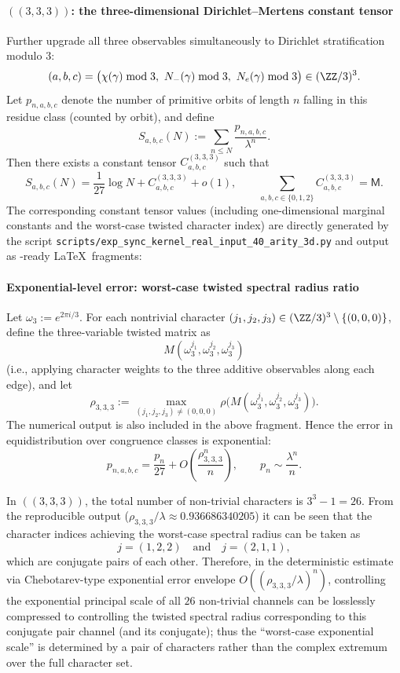 \paragraph{\texorpdfstring{$((3,3,3))$}{(3,3,3)}: the three-dimensional Dirichlet--Mertens constant tensor}
Further upgrade all three observables simultaneously to Dirichlet stratification modulo $3$:
$$
(a,b,c)=\bigl(\chi(\gamma)\bmod 3,\ N_-(\gamma)\bmod 3,\ N_e(\gamma)\bmod 3\bigr)\in(\ZZ/3)^3.
$$
Let $p_{n,a,b,c}$ denote the number of primitive orbits of length $n$ falling in this residue class (counted by orbit), and define
$$
S_{a,b,c}(N):=\sum_{n\le N}\frac{p_{n,a,b,c}}{\lambda^n}.
$$
Then there exists a constant tensor $C^{(3,3,3)}_{a,b,c}$ such that
$$
S_{a,b,c}(N)=\frac{1}{27}\log N + C^{(3,3,3)}_{a,b,c}+o(1),
\qquad
\sum_{a,b,c\in\{0,1,2\}} C^{(3,3,3)}_{a,b,c}=\mathsf{M}.
$$
The corresponding constant tensor values (including one-dimensional marginal constants and the worst-case twisted character index) are directly generated by the script
\texttt{scripts/exp\_sync\_kernel\_real\_input\_40\_arity\_3d.py}
and output as \verb||-ready \LaTeX\ fragments:


\paragraph{Exponential-level error: worst-case twisted spectral radius ratio}
Let $\omega_3:=e^{2\pi i/3}$. For each nontrivial character $(j_1,j_2,j_3)\in(\ZZ/3)^3\setminus\{(0,0,0)\}$, define the three-variable twisted matrix as
$$
M(\omega_3^{j_1},\omega_3^{j_2},\omega_3^{j_3})
$$
(i.e., applying character weights to the three additive observables along each edge), and let
$$
\rho_{3,3,3}
:=
\max_{(j_1,j_2,j_3)\neq(0,0,0)}
\rho\bigl(M(\omega_3^{j_1},\omega_3^{j_2},\omega_3^{j_3})\bigr).
$$
The numerical output is also included in the above \verb|| fragment.
Hence the error in equidistribution over congruence classes is exponential:
$$
p_{n,a,b,c}=\frac{p_n}{27}+O\!\left(\frac{\rho_{3,3,3}^n}{n}\right),
\qquad
p_n\sim\frac{\lambda^n}{n}.
$$

\begin{remark}\label{rem:arity-333-worst-twist-conjugate-pair}
In \(((3,3,3))\), the total number of non-trivial characters is \(3^3-1=26\). From the reproducible output (\(\rho_{3,3,3}/\lambda\approx 0.936686340205\)) it can be seen that the character indices achieving the worst-case spectral radius can be taken as
\[
j=(1,2,2)\quad\text{and}\quad j=(2,1,1),
\]
which are conjugate pairs of each other.
Therefore, in the deterministic estimate via Chebotarev-type exponential error envelope \(O((\rho_{3,3,3}/\lambda)^n)\), controlling the exponential principal scale of all \(26\) non-trivial channels can be losslessly compressed to controlling the twisted spectral radius corresponding to this conjugate pair channel (and its conjugate); thus the ``worst-case exponential scale'' is determined by a pair of characters rather than the complex extremum over the full character set.
\end{remark}

